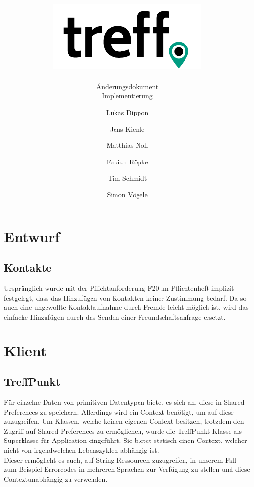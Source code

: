 \documentclass[parskip=full,11pt]{scrartcl}
\title{\includegraphics[width = 80mm]{images/logo_crop.png}}
\subtitle{\huge Änderungsdokument\\Implementierung}
\author{Lukas Dippon
        \and Jens Kienle
        \and Matthias Noll
        \and Fabian Röpke
        \and Tim Schmidt
        \and Simon Vögele}
\begin{document}
\maketitle
\thispagestyle{empty} %

\pagebreak
\tableofcontents

\pagebreak
\section{Entwurf}

\subsection{Kontakte}
Ursprünglich wurde mit der Pflichtanforderung F20 im Pflichtenheft implizit 
festgelegt, dass das Hinzufügen von Kontakten keiner Zustimmung bedarf. Da so 
auch eine ungewollte Kontaktaufnahme durch Fremde leicht möglich ist, wird das 
einfache Hinzufügen durch das Senden einer Freundschaftsanfrage ersetzt.


\pagebreak
\section{Klient}

\subsection{TreffPunkt}
Für einzelne Daten von primitiven Datentypen bietet es sich an, diese in
Shared-Preferences zu speichern. Allerdings wird ein Context benötigt, um auf
diese zuzugreifen. Um Klassen, welche keinen eigenen Context besitzen, trotzdem
den Zugriff auf Shared-Preferences zu ermöglichen, wurde die TreffPunkt Klasse
als Superklasse für Application eingeführt. Sie bietet statisch einen Context,
welcher nicht von irgendwelchen Lebenszyklen abhängig ist.\\
Dieser ermöglicht es auch, auf String Ressourcen zuzugreifen, in unserem Fall
zum Beispiel Errorcodes in mehreren Sprachen zur Verfügung zu stellen und diese
Contextunabhängig zu verwenden.
\end{document}
